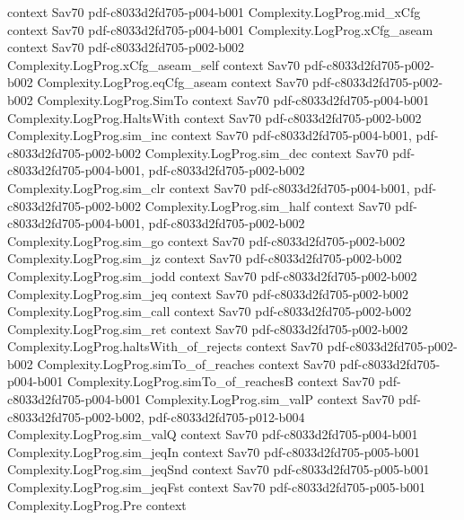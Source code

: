 \begin{theorem}
  {context}
  {Sav70}
  {pdf-c8033d2fd705-p004-b001}
\proofstep
  {Complexity.LogProg.mid_xCfg}
  {context}
  {Sav70}
  {pdf-c8033d2fd705-p004-b001}
\proofstep
  {Complexity.LogProg.xCfg_aseam}
  {context}
  {Sav70}
  {pdf-c8033d2fd705-p002-b002}
\proofstep
  {Complexity.LogProg.xCfg_aseam_self}
  {context}
  {Sav70}
  {pdf-c8033d2fd705-p002-b002}
\proofstep
  {Complexity.LogProg.eqCfg_aseam}
  {context}
  {Sav70}
  {pdf-c8033d2fd705-p002-b002}
\proofstep
  {Complexity.LogProg.SimTo}
  {context}
  {Sav70}
  {pdf-c8033d2fd705-p004-b001}
\proofstep
  {Complexity.LogProg.HaltsWith}
  {context}
  {Sav70}
  {pdf-c8033d2fd705-p002-b002}
\proofstep
  {Complexity.LogProg.sim_inc}
  {context}
  {Sav70}
  {pdf-c8033d2fd705-p004-b001,
    pdf-c8033d2fd705-p002-b002}
\proofstep
  {Complexity.LogProg.sim_dec}
  {context}
  {Sav70}
  {pdf-c8033d2fd705-p004-b001,
    pdf-c8033d2fd705-p002-b002}
\proofstep
  {Complexity.LogProg.sim_clr}
  {context}
  {Sav70}
  {pdf-c8033d2fd705-p004-b001,
    pdf-c8033d2fd705-p002-b002}
\proofstep
  {Complexity.LogProg.sim_half}
  {context}
  {Sav70}
  {pdf-c8033d2fd705-p004-b001,
    pdf-c8033d2fd705-p002-b002}
\proofstep
  {Complexity.LogProg.sim_go}
  {context}
  {Sav70}
  {pdf-c8033d2fd705-p002-b002}
\proofstep
  {Complexity.LogProg.sim_jz}
  {context}
  {Sav70}
  {pdf-c8033d2fd705-p002-b002}
\proofstep
  {Complexity.LogProg.sim_jodd}
  {context}
  {Sav70}
  {pdf-c8033d2fd705-p002-b002}
\proofstep
  {Complexity.LogProg.sim_jeq}
  {context}
  {Sav70}
  {pdf-c8033d2fd705-p002-b002}
\proofstep
  {Complexity.LogProg.sim_call}
  {context}
  {Sav70}
  {pdf-c8033d2fd705-p002-b002}
\proofstep
  {Complexity.LogProg.sim_ret}
  {context}
  {Sav70}
  {pdf-c8033d2fd705-p002-b002}
\proofstep
  {Complexity.LogProg.haltsWith_of_rejects}
  {context}
  {Sav70}
  {pdf-c8033d2fd705-p002-b002}
\proofstep
  {Complexity.LogProg.simTo_of_reaches}
  {context}
  {Sav70}
  {pdf-c8033d2fd705-p004-b001}
\proofstep
  {Complexity.LogProg.simTo_of_reachesB}
  {context}
  {Sav70}
  {pdf-c8033d2fd705-p004-b001}
\proofstep
  {Complexity.LogProg.sim_valP}
  {context}
  {Sav70}
  {pdf-c8033d2fd705-p002-b002,
    pdf-c8033d2fd705-p012-b004}
\proofstep
  {Complexity.LogProg.sim_valQ}
  {context}
  {Sav70}
  {pdf-c8033d2fd705-p004-b001}
\proofstep
  {Complexity.LogProg.sim_jeqIn}
  {context}
  {Sav70}
  {pdf-c8033d2fd705-p005-b001}
\proofstep
  {Complexity.LogProg.sim_jeqSnd}
  {context}
  {Sav70}
  {pdf-c8033d2fd705-p005-b001}
\proofstep
  {Complexity.LogProg.sim_jeqFst}
  {context}
  {Sav70}
  {pdf-c8033d2fd705-p005-b001}
\proofstep
  {Complexity.LogProg.Pre}
  {context}

\end{theorem}
